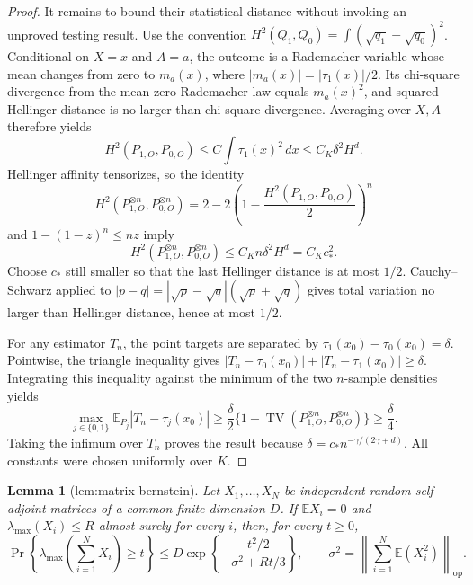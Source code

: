 \documentclass{article}
\newtheorem{lemma}{Lemma}
\begin{document}
\begin{proof}
It remains to bound their statistical distance without invoking an
unproved testing result.  Use the convention
\(H^2(Q_1,Q_0)=\int(\sqrt{q_1}-\sqrt{q_0})^2\).  Conditional on \(X=x\) and
\(A=a\), the outcome is a Rademacher variable whose mean changes from zero
to \(m_a(x)\), where \(|m_a(x)|=|\tau_1(x)|/2\).  Its chi-square divergence
from the mean-zero Rademacher law equals \(m_a(x)^2\), and squared Hellinger
distance is no larger than chi-square divergence.  Averaging over \(X,A\)
therefore yields
\[
H^2(P_{1,O},P_{0,O})\leq C\int\tau_1(x)^2\,dx
\leq C_K\delta^2H^d.
\]
Hellinger affinity tensorizes, so the identity
\[
H^2(P_{1,O}^{\otimes n},P_{0,O}^{\otimes n})
=2-2\left(1-\frac{H^2(P_{1,O},P_{0,O})}{2}\right)^n
\]
and \(1-(1-z)^n\leq nz\) imply
\[
H^2(P_{1,O}^{\otimes n},P_{0,O}^{\otimes n})
\leq C_Kn\delta^2H^d=C_Kc_*^2.
\]
Choose \(c_*\) still smaller so that the last Hellinger distance is at most
\(1/2\).  Cauchy--Schwarz applied to
\(|p-q|=|\sqrt p-\sqrt q|(\sqrt p+\sqrt q)\) gives total variation no larger
than Hellinger distance, hence at most \(1/2\).

For any estimator \(T_n\), the point targets are separated by
\(\tau_1(x_0)-\tau_0(x_0)=\delta\).  Pointwise, the triangle inequality gives
\(|T_n-\tau_0(x_0)|+|T_n-\tau_1(x_0)|\geq\delta\).  Integrating this inequality
against the minimum of the two \(n\)-sample densities yields
\[
\max_{j\in\{0,1\}}\mathbb E_{P_j}|T_n-\tau_j(x_0)|
\geq\frac{\delta}{2}\{1-\operatorname{TV}(P_{1,O}^{\otimes n},P_{0,O}^{\otimes n})\}
\geq\frac{\delta}{4}.
\]
Taking the infimum over \(T_n\) proves the result because
\(\delta=c_*n^{-\gamma/(2\gamma+d)}\).  All constants were chosen uniformly
over \(K\).
\end{proof}

\begin{lemma}[lem:matrix-bernstein]\label{lem:matrix-bernstein}
Let \(X_1,\ldots,X_N\) be independent random self-adjoint matrices of a common finite dimension \(D\).  If \(\mathbb E X_i=0\) and \(\lambda_{\max}(X_i)\leq R\) almost surely for every \(i\), then, for every \(t\geq0\),
\[
\Pr\!\left\{\lambda_{\max}\!\left(\sum_{i=1}^N X_i\right)\geq t\right\}
\leq D\exp\!\left\{-\frac{t^2/2}{\sigma^2+Rt/3}\right\},
\qquad
\sigma^2=\left\|\sum_{i=1}^N\mathbb E(X_i^2)\right\|_{\mathrm{op}}.
\]
\end{lemma}
\end{document}
